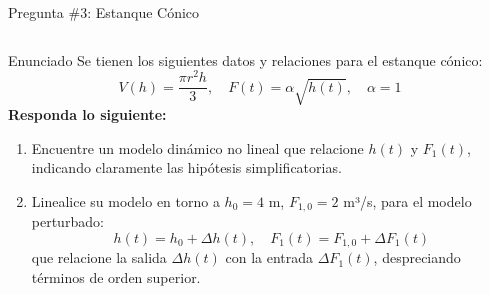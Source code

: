 \documentclass[
    10pt,
    aspectratio=169,
    xcolor={dvipsnames},
    spanish,
    ]{beamer}
\begin{document}
\begin{frame}{Pregunta \#3: Estanque Cónico}
\begin{columns}
    \begin{column}{0.64\textwidth}
      \scriptsize
      \begin{block}{Enunciado}
        Se tienen los siguientes datos y relaciones para el estanque cónico:
        \[
        V(h) = \frac{\pi r^2 h}{3}, \quad
        F(t) = \alpha \sqrt{h(t)}, \quad \alpha = 1
        \]
        \textbf{Responda lo siguiente:}
        \begin{enumerate}
            \setlength\itemsep{0.2em}
            \item Encuentre un modelo dinámico no lineal que relacione $h(t)$ y $F_1(t)$, indicando claramente las hipótesis simplificatorias.
            \item Linealice su modelo en torno a $h_0 = 4$ m, $F_{1,0} = 2$ m³/s, para el modelo perturbado:
            \[
                h(t) = h_0 + \Delta h(t), \quad 
                F_1(t) = F_{1,0} + \Delta F_1(t)
            \]
            que relacione la salida $\Delta h(t)$ con la entrada $\Delta F_1(t)$, despreciando términos de orden superior.
        \end{enumerate}
      \end{block}
    \end{column}
  \end{columns}
\end{frame}
\end{document}

